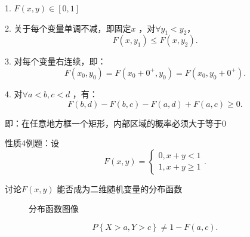 1. $F\left( x,y \right) \in [0,1]$

2. 关于每个变量单调不减，即固定$x$ ，对$\forall y_1<y_2$， \[
    F\left( x,y_1 \right) \le F(x,y_2)
.\] 

3. 对每个变量右连续，即：\[
    F\left( x_0,y_0 \right) =F\left( x_0+0^{+},y_0 \right) =F\left( x_0,y_0+0^{+} \right) 
.\] 

4. 对$\forall a<b,c<d$ ，有：\[
    F\left( b,d \right) -F\left( b,c \right) -F\left( a,d \right) +F\left( a,c \right) \ge 0
.\] 

即：在任意地方框一个矩形，内部区域的概率必须大于等于0
\begin{eg}
    性质4例题：设 \[
        F\left( x,y \right) =\begin{cases}
            0,x+y<1\\
            1,x+y\ge 1
        \end{cases}
    .\] 

    讨论$F\left( x,y \right) $ 能否成为二维随机变量的分布函数

    \begin{figure}[htbp]
        \centering
        \caption{分布函数图像}
        \label{分布函数图像}
    \end{figure}
\end{eg}
\begin{notation}
    \[
        P\left\{ X>a,Y>c \right\} \neq 1-F\left( a,c \right) 
    .\] 
\end{notation}

